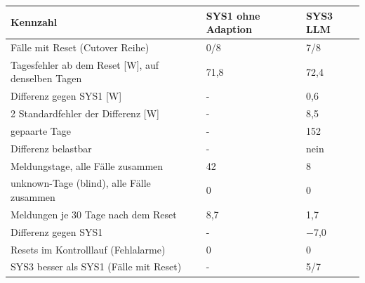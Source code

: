 \begin{tabular}{lll}
\toprule
Kennzahl & SYS1 ohne Adaption & SYS3 LLM \\
\midrule
Fälle mit Reset (Cutover \texttimes{} Reihe) & 0/8 & 7/8 \\
Tagesfehler ab dem Reset [W], auf denselben Tagen & 71,8 & 72,4 \\
Differenz gegen SYS1 [W] & - & 0,6 \\
2 Standardfehler der Differenz [W] & - & 8,5 \\
gepaarte Tage & - & 152 \\
Differenz belastbar & - & nein \\
Meldungstage, alle Fälle zusammen & 42 & 8 \\
unknown-Tage (blind), alle Fälle zusammen & 0 & 0 \\
Meldungen je 30 Tage nach dem Reset & 8,7 & 1,7 \\
Differenz gegen SYS1 & - & $-$7,0 \\
Resets im Kontrolllauf (Fehlalarme) & 0 & 0 \\
SYS3 besser als SYS1 (Fälle mit Reset) & - & 5/7 \\
\bottomrule
\end{tabular}
